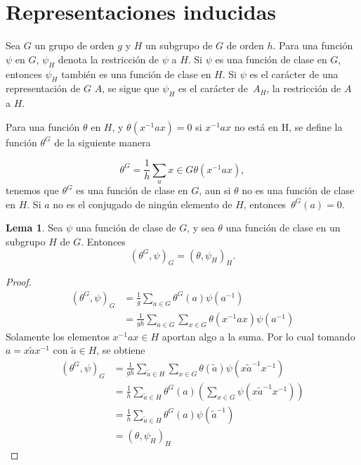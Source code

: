 \documentclass[12pt]{book}
\theoremstyle{definition}
\newtheorem{lemma}[theorem]{Lema}
\newcounter{in}
\begin{document}
\section{Representaciones inducidas}
\label{sec:ri}

Sea $G$ un grupo de orden $g$ y $H$ un subgrupo de $G$ de orden
$h$. Para una función $\psi$ en $G$, $\psi_{H}$ denota la restricción
de $\psi$ a $H$. Si $\psi$ es una función de clase en $G$, entonces
$\psi_{H}$ también es una función de clase en $H$. Si $\psi$ es el
carácter de una representación de $G$ $A$, se sigue que $\psi_{H}$ es
el carácter de~$A_{H}$, la restricción de $A$ a $H$.

Para una función $\theta$ en $H$, y $\theta(x^{-1}ax)=0$ si $x^{-1}ax$
no está en H, se define la función $\theta^{G}$ de la siguiente manera

\begin{equation}
  \label{eq:58}
  \theta^{G}=\frac{1}{h} \sum_ u{x \in G} \theta(x^{-1}ax),
\end{equation}
tenemos que $\theta^{G}$ es una función de clase en $G$, aun si
$\theta$ no es una función de clase en $H$. Si $a$ no es el conjugado
de ningún elemento de $H$, entonces~$\theta^{G}(a)=0$.

\begin{lemma}
  \label{l5_1}
  Sea $\psi$ una función de clase de $G$, y sea $\theta$ una función
  de clase en un subgrupo $H$ de $G$. Entonces
  \begin{equation*}
    (\theta^{G},\psi)_{G}= (\theta,\psi_{H})_{H} .
  \end{equation*}
\end{lemma} 

\begin{proof}
  \begin{equation}
    \label{eq:59}
    \begin{aligned}
      (\theta^{G},\psi)_{G} &= \frac{1}{g} \sum_{a \in G} \theta^{G}(a) \psi(a^{-1})\\
      &= \frac{1}{gh} \sum_{a \in G} \sum_{x \in G} \theta(x^{-1}ax) \psi(a^{-1})
    \end{aligned}
  \end{equation}  
  Solamente los elementos $x^{-1}ax \in H$ aportan algo a la suma. Por
  lo cual tomando $a=x \tilde{a} x^{-1}$ con $\tilde{a} \in H$, se
  obtiene
  \begin{equation}
    \label{eq:60}
    \begin{aligned}
      (\theta^{G},\psi)_{G} &= \frac{1}{gh} \sum_{\tilde{a} \in H} \sum_{x \in G} \theta(\tilde{a}) \psi(x \tilde{a}^{-1} x^{-1})\\
      &= \frac{1}{h} \sum_{\tilde{a} \in H} \theta^{G}(a) (\sum_{x \in G} \psi(x \tilde{a}^{-1}x^{-1})) \\
      &= \frac{1}{h} \sum_{\tilde{a} \in H} \theta^{G}(a) \psi(\tilde{a}^{-1}) \\
      &=  (\theta,\psi_{H})_{H}
    \end{aligned}
  \end{equation}
\end{proof}
\end{document}
